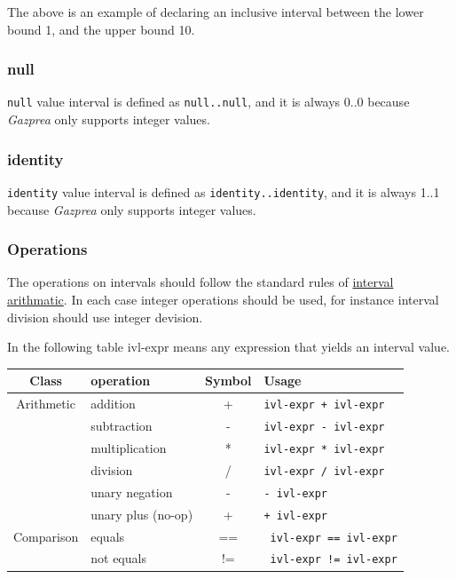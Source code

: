\documentclass{article}
\begin{document}
		The above is an example of declaring an inclusive interval between the lower bound 1, and the upper bound 10.

	\subsubsection{null}

		\texttt{null} value interval is defined as \texttt{null..null}, and it is always 0..0 because \textit{Gazprea}
		only supports integer values.

	\subsubsection{identity}

		\texttt{identity} value interval is defined as \texttt{identity..identity}, and it is always 1..1 because
		\textit{Gazprea} only supports integer values.

	\subsubsection{Operations}

		The operations on intervals should follow the standard rules of
		\href{http://en.wikipedia.org/wiki/Interval_arithmetic}{interval arithmatic}. In each case integer operations
		should be used, for instance interval division should use integer devision.

		In the following table ivl-expr means any expression that yields an interval value.

		\begin{center}
			\begin{tabular}{|c|l|c|l|}
				\hline
				\textbf{Class} & \textbf{operation} & \textbf{Symbol} & \textbf{Usage} \\
				\hline
				Arithmetic & addition           & + & \texttt{ivl-expr + ivl-expr}  \\
				           & subtraction        & - &  \texttt{ivl-expr - ivl-expr}	\\
				           & multiplication     & * & \texttt{ivl-expr * ivl-expr}	\\
				           & division           & / & \texttt{ivl-expr / ivl-expr}	\\
				           & unary negation     & - & \texttt{- ivl-expr}	          \\
				           & unary plus (no-op) & + & \texttt{+ ivl-expr}           \\
				\hline
				Comparison & equals     & == & \texttt{ ivl-expr == ivl-expr} \\
				           & not equals & != & \texttt{ ivl-expr != ivl-expr} \\
				\hline
			\end{tabular}
		\end{center}
\end{document}
